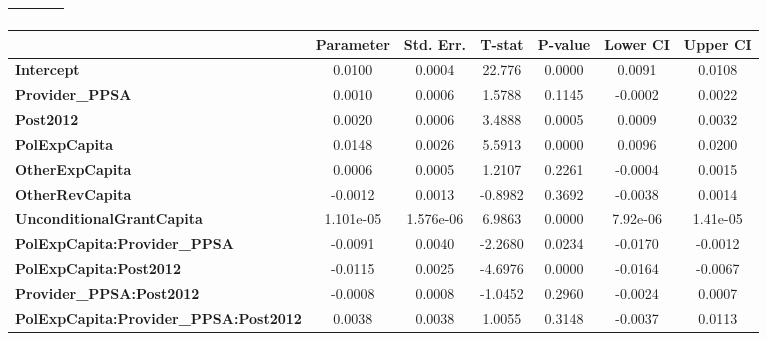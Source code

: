 \begin{center}
\begin{tabular}{lclc}
\textbf{}                                     &                    & \textbf{                     }   &                  \\
\bottomrule
\end{tabular}
\begin{tabular}{lcccccc}
                                              & \textbf{Parameter} & \textbf{Std. Err.} & \textbf{T-stat} & \textbf{P-value} & \textbf{Lower CI} & \textbf{Upper CI}  \\
\midrule
\textbf{Intercept}                            &       0.0100       &       0.0004       &      22.776     &      0.0000      &       0.0091      &       0.0108       \\
\textbf{Provider\_PPSA}                       &       0.0010       &       0.0006       &      1.5788     &      0.1145      &      -0.0002      &       0.0022       \\
\textbf{Post2012}                             &       0.0020       &       0.0006       &      3.4888     &      0.0005      &       0.0009      &       0.0032       \\
\textbf{PolExpCapita}                         &       0.0148       &       0.0026       &      5.5913     &      0.0000      &       0.0096      &       0.0200       \\
\textbf{OtherExpCapita}                       &       0.0006       &       0.0005       &      1.2107     &      0.2261      &      -0.0004      &       0.0015       \\
\textbf{OtherRevCapita}                       &      -0.0012       &       0.0013       &     -0.8982     &      0.3692      &      -0.0038      &       0.0014       \\
\textbf{UnconditionalGrantCapita}             &     1.101e-05      &     1.576e-06      &      6.9863     &      0.0000      &      7.92e-06     &      1.41e-05      \\
\textbf{PolExpCapita:Provider\_PPSA}          &      -0.0091       &       0.0040       &     -2.2680     &      0.0234      &      -0.0170      &      -0.0012       \\
\textbf{PolExpCapita:Post2012}                &      -0.0115       &       0.0025       &     -4.6976     &      0.0000      &      -0.0164      &      -0.0067       \\
\textbf{Provider\_PPSA:Post2012}              &      -0.0008       &       0.0008       &     -1.0452     &      0.2960      &      -0.0024      &       0.0007       \\
\textbf{PolExpCapita:Provider\_PPSA:Post2012} &       0.0038       &       0.0038       &      1.0055     &      0.3148      &      -0.0037      &       0.0113       \\
\bottomrule
\end{tabular}
\end{center}